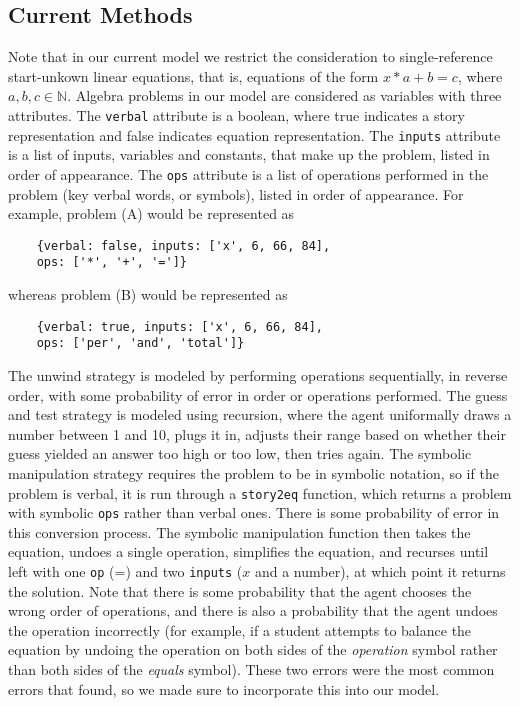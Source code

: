 \documentclass[10pt,letterpaper]{article}
\begin{document}
	\subsection{Current Methods}
	
	Note that in our current model we restrict the consideration to single-reference start-unkown linear equations, that is, equations of the form $x*a+b=c$, where $a,b,c\in\mathbb{N}$. Algebra problems in our model are considered as variables with three attributes. The \verb|verbal| attribute is a boolean, where true indicates a story representation and false indicates equation representation. The \verb|inputs| attribute is a list of inputs, variables and constants, that make up the problem, listed in order of appearance. The \verb|ops| attribute is a list of operations performed in the problem (key verbal words, or symbols), listed in order of appearance.
	For example, problem (A) would be represented as 
	\begin{verbatim}
	{verbal: false, inputs: ['x', 6, 66, 84], 
	ops: ['*', '+', '=']}
	\end{verbatim}
	whereas problem (B) would be represented as
	\begin{verbatim}
	{verbal: true, inputs: ['x', 6, 66, 84], 
	ops: ['per', 'and', 'total']}
	\end{verbatim}
	
	The unwind strategy is modeled by performing operations sequentially, in reverse order, with some probability of error in order or operations performed. The guess and test strategy is modeled using recursion, where the agent uniformally draws a number between 1 and 10, plugs it in, adjusts their range based on whether their guess yielded an answer too high or too low, then tries again. The symbolic manipulation strategy requires the problem to be in symbolic notation, so if the problem is verbal, it is run through a \verb|story2eq| function, which returns a problem with symbolic \verb|ops| rather than verbal ones. There is some probability of error in this conversion process. The symbolic manipulation function then takes the equation, undoes a single operation, simplifies the equation, and recurses until left with one \verb|op| (=) and two \verb|inputs| ($x$ and a number), at which point it returns the solution. Note that there is some probability that the agent chooses the wrong order of operations, and there is also a probability that the agent undoes the operation incorrectly (for example, if a student attempts to balance the equation by undoing the operation on both sides of the \textit{operation} symbol rather than both sides of the \textit{equals} symbol). These two errors were the most common errors that  found, so we made sure to incorporate this into our model.
	
\end{document}
